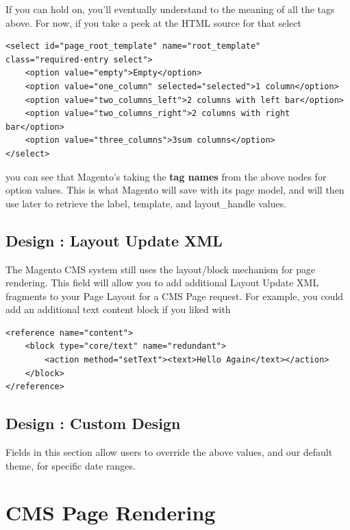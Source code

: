 \documentclass[oneside]{book}
\begin{document}
If you can hold on, you'll eventually understand to the meaning of all the tags above. For now, if you take a peek at the HTML source for that select

\begin{lstlisting}
<select id="page_root_template" name="root_template" 
class="required-entry select">
    <option value="empty">Empty</option>
    <option value="one_column" selected="selected">1 column</option>
    <option value="two_columns_left">2 columns with left bar</option>
    <option value="two_columns_right">2 columns with right bar</option>
    <option value="three_columns">3sum columns</option>
</select>

\end{lstlisting}


you can see that Magento's taking the \textbf{tag names} from the above nodes for option values.  This is what Magento will save with its page model, and will then use later to retrieve the label, template, and layout\_handle values.

\subsection{Design : Layout Update XML}

The Magento CMS system still uses the layout/block mechanism for page rendering.  This field will allow you to add additional Layout Update XML fragments to your Page Layout for a CMS Page request.  For example, you could add an additional text content block if you liked with 

\begin{lstlisting}
<reference name="content">
    <block type="core/text" name="redundant">
        <action method="setText"><text>Hello Again</text></action>
    </block>
</reference>

\end{lstlisting}


\subsection{Design : Custom Design}

Fields in this section allow users to override the above values, and our default theme, for specific date ranges.  

\section{CMS Page Rendering}
\end{document}
